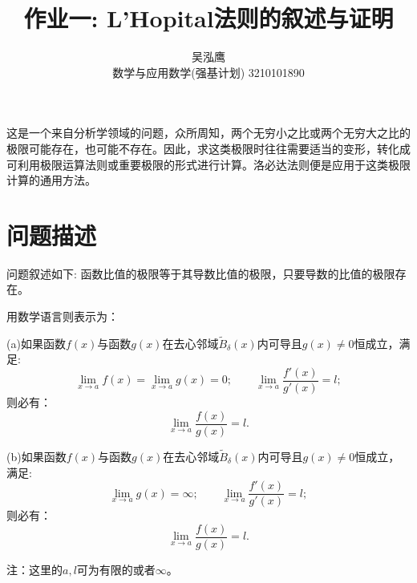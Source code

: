 \documentclass{ctexart}
\title{作业一: L'Hopital法则的叙述与证明}
\author{吴泓鹰 \\ 数学与应用数学(强基计划) 3210101890}
\begin{document}
\maketitle


这是一个来自分析学领域的问题，众所周知，两个无穷小之比或两个无穷大之比的极限可能存在，也可能不存在。因此，求这类极限时往往需要适当的变形，转化成可利用极限运算法则或重要极限的形式进行计算。洛必达法则便是应用于这类极限计算的通用方法。
\section{问题描述}
问题叙述如下: 函数比值的极限等于其导数比值的极限，只要导数的比值的极限存在。

用数学语言则表示为：

(a)如果函数$f(x)$与函数$g(x)$在去心邻域$\tilde{B}_{\delta}(x)$内可导且$g(x)\ne0$恒成立，满足:
\begin{equation}
	\lim_{x \rightarrow a}f(x)=\lim_{x \rightarrow a}g(x)=0;\qquad\lim_{x \rightarrow a}\frac{f'(x)}{g'(x)}=l;\label{1}
\end{equation}
则必有：
\begin{equation}
	\lim_{x \rightarrow a}\frac{f(x)}{g(x)}=l.\label{2}
\end{equation}

(b)如果函数$f(x)$与函数$g(x)$在去心邻域$\tilde{B}_{\delta}(x)$内可导且$g(x)\ne0$恒成立，满足:
\begin{equation}
	\lim_{x \rightarrow a}g(x)=\infty;\qquad\lim_{x \rightarrow a}\frac{f'(x)}{g'(x)}=l;\label{3}
\end{equation}
则必有：
\begin{equation}
	\lim_{x \rightarrow a}\frac{f(x)}{g(x)}=l.\label{4}
\end{equation}

注：这里的$a,l$可为有限的或者$\infty$。
\end{document}
